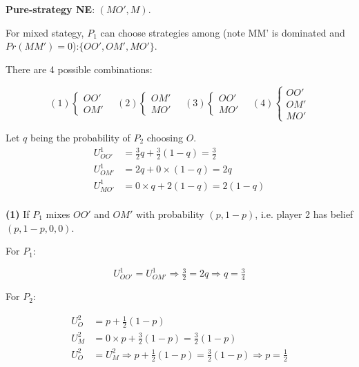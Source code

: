 \documentclass{article}
\begin{document}
\medskip

\textbf{Pure-strategy NE}: $(MO', M)$. 

\medskip

For mixed stategy, $P_1$ can choose strategies among (note MM' is dominated and $Pr(MM')=0$):$\{OO' , OM' , MO'\}$.

\medskip

There are 4 possible combinations:

\begin{equation}
(1)
    \begin{cases}
OO' \\ OM'
    \end{cases}
\quad (2)
    \begin{cases}
 OM' \\ MO'
    \end{cases}
 \quad (3) 
    \begin{cases}
OO'  \\ MO'
    \end{cases}
 \quad (4) 
    \begin{cases}
OO' \\ OM' \\ MO'
    \end{cases}
\nonumber
\end{equation}

Let $q$ being the probability of $P_2$ choosing $O$.
\begin{align*}
U^1_{OO'} &= \tfrac32 q + \tfrac32 (1-q) = \tfrac32 \\
U^1_{OM'} &= 2 q + 0 \times (1-q) = 2q \\
U^1_{MO'} &= 0 \times q +  2 (1-q) = 2 (1-q) \\
\end{align*}


\medskip

\textbf{(1)} If $P_1$ mixes $OO'$ and $OM'$ with probability $(p,1-p)$, i.e. player 2 has belief $(p,1-p,0,0)$.
\medskip

For $P_1$:

$$U^1_{OO'} = U^1_{OM'} \Rightarrow \tfrac32 = 2q  \Rightarrow  q =\tfrac34$$

For $P_2$:

\begin{align*}
U^2_{O} &= p + \tfrac12 (1-p) \\
U^2_{M} &= 0 \times p + \tfrac32 (1-p) = \tfrac32 (1-p) \\
U^2_{O} &= U^2_{M} \Rightarrow p + \tfrac12 (1-p) =  \tfrac32 (1-p) \Rightarrow p=\tfrac12
\end{align*}
\end{document}
